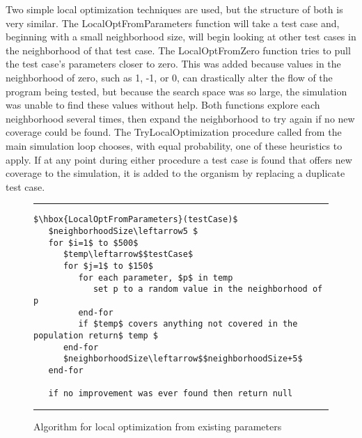 \documentclass[runningheads]{llncs}
\begin{document}
Two simple local optimization techniques are used, but the structure of both is very similar. The LocalOptFromParameters function will take a test case and, beginning with a small neighborhood size, will begin looking at other test cases in the neighborhood of that test case. The LocalOptFromZero function tries to pull the test case's parameters closer to zero. This was added because values in the neighborhood of zero, such as 1, -1, or 0, can drastically alter the flow of the program being tested, but because the search space was so large, the simulation was unable to find these values without help. Both functions explore each neighborhood several times, then expand the neighborhood to try again if no new coverage could be found. The TryLocalOptimization procedure called from the main simulation loop chooses, with equal probability, one of these heuristics to apply. If at any point during either procedure a test case is found that offers new coverage to the simulation, it is added to the organism by replacing a duplicate test case.
\begin{comment}
\begin{figure}[h!]
\begin{center}
\hrule
\medskip
\begin{Verbatim}[fontfamily=tt, xleftmargin=10pt, commandchars=\\\{\},
codes={\catcode`$=3\catcode`^=7\catcode`_=8}]
$\hbox{TryLocalOptimization}()$
      $org\leftarrow$$P$.Select()
		
      Randomaly select one of the two local opt functions and try it on a 
         duplicate test case from $org$, store results in$ tc $
		
      if$ tc $ is not null replace a duplicate test case in$ org $ with tc
\end{Verbatim}
\hrule
\end{center}
\caption{Algorithm for selection of a local optimization \label{fig:lcOpt}}
\end{figure
\end{comment}
\begin{figure}[h!]
	\begin{center}
		\hrule
		\medskip
		\begin{Verbatim}[fontfamily=tt, xleftmargin=10pt, commandchars=\\\{\},
		codes={\catcode`$=3\catcode`^=7\catcode`_=8}]
$\hbox{LocalOptFromParameters}(testCase)$
   $neighborhoodSize\leftarrow5 $
   for $i=1$ to $500$ 
      $temp\leftarrow$$testCase$
      for $j=1$ to $150$
         for each parameter, $p$ in temp
            set p to a random value in the neighborhood of p
         end-for     
         if $temp$ covers anything not covered in the population return$ temp $
      end-for
      $neighborhoodSize\leftarrow$$neighborhoodSize+5$
   end-for

   if no improvement was ever found then return null
		\end{Verbatim}
		\hrule
	\end{center}
	\caption{Algorithm for local optimization from existing parameters \label{fig:lcOptFP}}
\end{figure}
\end{document}
